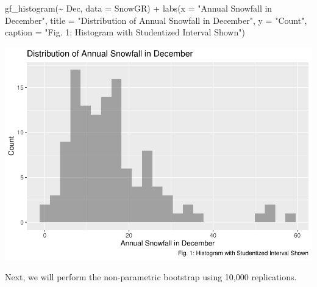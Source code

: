 \documentclass[12pt]{article}
\newenvironment{Shaded}{\begin{snugshade}}{\end{snugshade}}
\newcommand{\AttributeTok}[1]{\textcolor[rgb]{0.77,0.63,0.00}{#1}}
\newcommand{\FunctionTok}[1]{\textcolor[rgb]{0.00,0.00,0.00}{#1}}
\newcommand{\NormalTok}[1]{#1}
\newcommand{\SpecialCharTok}[1]{\textcolor[rgb]{0.00,0.00,0.00}{#1}}
\newcommand{\StringTok}[1]{\textcolor[rgb]{0.31,0.60,0.02}{#1}}
\begin{document}
\begin{Shaded}
\begin{Highlighting}[]
\FunctionTok{gf\_histogram}\NormalTok{(}\SpecialCharTok{\textasciitilde{}}\NormalTok{ Dec, }\AttributeTok{data =}\NormalTok{ SnowGR) }\SpecialCharTok{+}
  \FunctionTok{labs}\NormalTok{(}\AttributeTok{x =} \StringTok{"Annual Snowfall in December"}\NormalTok{, }
       \AttributeTok{title =} \StringTok{"Distribution of Annual Snowfall in December"}\NormalTok{, }\AttributeTok{y =} \StringTok{"Count"}\NormalTok{,}
       \AttributeTok{caption =} \StringTok{"Fig. 1: Histogram with Studentized Interval Shown"}\NormalTok{)}
\end{Highlighting}
\end{Shaded}

\includegraphics{paper_files/figure-latex/unnamed-chunk-1-1.pdf}

Next, we will perform the non-parametric bootstrap using 10,000
replications.
\end{document}
